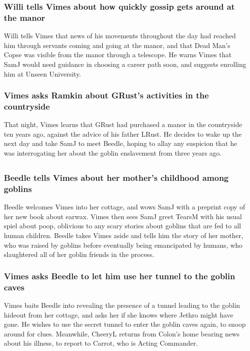 \subsubsection{\Gls{Willi} tells \Gls{Vimes} about how quickly gossip gets around at the manor}
\Gls{Willi} tells \Gls{Vimes} that news of his movements throughout the day had reached him through
servants coming and going at the manor, and that Dead Man's Copse was visible from the manor
through a telescope. He warns \Gls{Vimes} that \Gls{SamJ} would need guidance in choosing a career
path soon, and suggests enrolling him at Unseen University.

\subsubsection{\Gls{Vimes} asks \Gls{Ramkin} about \Gls{GRust}'s activities in the countryside}
That night, \Gls{Vimes} learns that \Gls{GRust} had purchased a manor in the countryside ten years
ago, against the advice of his father \Gls{LRust}. He decides to wake up the next day and take
\Gls{SamJ} to meet \Gls{Beedle}, hoping to allay any suspicion that he was interrogating her about
the goblin enslavement from three years ago.

\subsection{}
\subsubsection{\Gls{Beedle} tells \Gls{Vimes} about her mother's childhood among goblins}
\Gls{Beedle} welcomes \Gls{Vimes} into her cottage, and wows \Gls{SamJ} with a preprint copy of her
new book about earwax. \Gls{Vimes} then sees \Gls{SamJ} greet \Gls{TearsM} with his usual spiel
about poop, oblivious to any scary stories about goblins that are fed to all human children.
\Gls{Beedle} takes \Gls{Vimes} aside and tells him the story of her mother, who was raised by
goblins before eventually being emancipated by humans, who slaughtered all of her goblin friends in
the process.

\subsubsection{\Gls{Vimes} asks \Gls{Beedle} to let him use her tunnel to the goblin caves}
\Gls{Vimes} baits \Gls{Beedle} into revealing the presence of a tunnel leading to the goblin
hideout from her cottage, and asks her if she knows where \Gls{Jethro} might have gone. He wishes to
use the secret tunnel to enter the goblin caves again, to snoop around for clues. Meanwhile,
\Gls{CheeryL} returns from \Gls{Colon}'s home bearing news about his illness, to report to
\Gls{Carrot}, who is Acting Commander.

